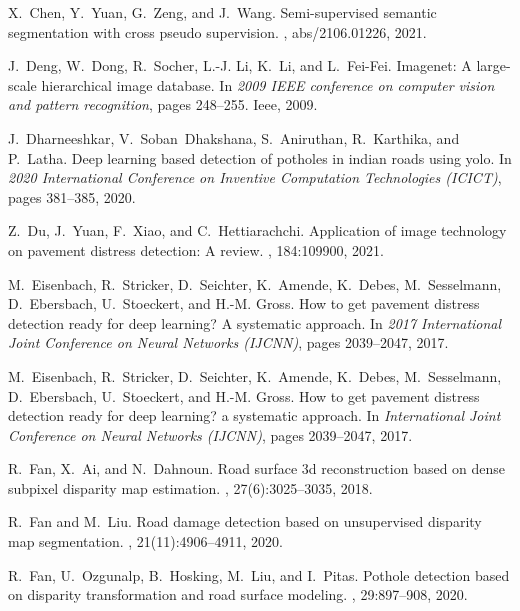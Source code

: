\documentclass[twocolumn]{article}
\begin{document}
\begin{thebibliography}{10}
X.~Chen, Y.~Yuan, G.~Zeng, and J.~Wang.
\newblock Semi-supervised semantic segmentation with cross pseudo supervision.
, abs/2106.01226, 2021.

J.~Deng, W.~Dong, R.~Socher, L.-J. Li, K.~Li, and L.~Fei-Fei.
\newblock Imagenet: A large-scale hierarchical image database.
\newblock In {\em 2009 IEEE conference on computer vision and pattern
  recognition}, pages 248--255. Ieee, 2009.

J.~Dharneeshkar, V.~Soban~Dhakshana, S.~Aniruthan, R.~Karthika, and P.~Latha.
\newblock Deep learning based detection of potholes in indian roads using yolo.
\newblock In {\em 2020 International Conference on Inventive Computation
  Technologies (ICICT)}, pages 381--385, 2020.

Z.~Du, J.~Yuan, F.~Xiao, and C.~Hettiarachchi.
\newblock Application of image technology on pavement distress detection: A
  review.
, 184:109900, 2021.

M.~Eisenbach, R.~Stricker, D.~Seichter, K.~Amende, K.~Debes, M.~Sesselmann,
  D.~Ebersbach, U.~Stoeckert, and H.-M. Gross.
\newblock How to get pavement distress detection ready for deep learning? {A}
  systematic approach.
\newblock In {\em 2017 International Joint Conference on Neural Networks
  (IJCNN)}, pages 2039--2047, 2017.

M.~Eisenbach, R.~Stricker, D.~Seichter, K.~Amende, K.~Debes, M.~Sesselmann,
  D.~Ebersbach, U.~Stoeckert, and H.-M. Gross.
\newblock How to get pavement distress detection ready for deep learning? a
  systematic approach.
\newblock In {\em International Joint Conference on Neural Networks (IJCNN)},
  pages 2039--2047, 2017.

R.~Fan, X.~Ai, and N.~Dahnoun.
\newblock Road surface 3d reconstruction based on dense subpixel disparity map
  estimation.
, 27(6):3025--3035, 2018.

R.~Fan and M.~Liu.
\newblock Road damage detection based on unsupervised disparity map
  segmentation.
,
  21(11):4906--4911, 2020.

R.~Fan, U.~Ozgunalp, B.~Hosking, M.~Liu, and I.~Pitas.
\newblock Pothole detection based on disparity transformation and road surface
  modeling.
, 29:897--908, 2020.


\end{thebibliography}
\end{document}
